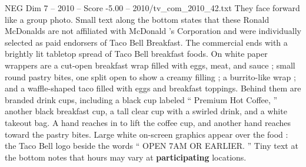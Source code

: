 \begin{textsample}{NEG Dim 7 – 2010 – Score -5.00 – 2010/tv\_com\_2010\_42.txt}
They face forward like a group photo.
Small text along the bottom states that these Ronald McDonalds are not affiliated with McDonald ’s Corporation and were individually selected as paid endorsers of Taco Bell Breakfast.
The commercial ends with a brightly lit tabletop spread of Taco Bell breakfast foods.
On white paper wrappers are a cut-open breakfast wrap filled with eggs, meat, and sauce ; small round pastry bites, one split open to show a creamy filling ; a burrito-like wrap ; and a waffle-shaped taco filled with eggs and breakfast toppings.
Behind them are branded drink cups, including a black cup labeled “ Premium Hot Coffee, ” another black breakfast cup, a tall clear cup with a swirled drink, and a white takeout bag.
A hand reaches in to lift the coffee cup, and another hand reaches toward the pastry bites.
Large white on-screen graphics appear over the food : the Taco Bell logo beside the words “ OPEN 7AM OR EARLIER. ” Tiny text at the bottom notes that hours may vary at \textbf{participating} locations.

\end{textsample}
